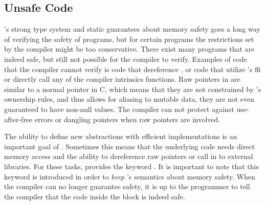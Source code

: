 \subsection{Unsafe Code} %
\label{ssub:unsafe_code}

{\rust}'s strong type system and static guarantees about memory safety goes a long way of verifying the safety of programs, but for certain programs the restrictions set by the compiler might be too conservative.
There exist many programs that are indeed safe, but still not possible for the compiler to verify.
Examples of code that the compiler cannot verify is code that dereference , or code that utilize {\rust}'s \gls{ffi} or directly call any of the compiler intrinsics functions.
Raw pointers in {\rust} are similar to a normal pointer in C, which means that they are not constrained by {\rust}'s ownership rules, and thus allows for aliasing to mutable data, they are not even guaranteed to have non-null values.
The compiler can not protect against use-after-free errors or dangling pointers when raw pointers are involved.

The ability to define new abstractions with efficient implementations is an important goal of {\rust}.
Sometimes this means that the underlying code needs direct memory access and the ability to dereference raw pointers or call in to external libraries.
For these tasks, {\rust} provides the keyword {\unsafe}.
It is important to note that this {\unsafe} keyword is introduced in order to \emph{keep} {\rust}'s semantics about memory safety.
When the compiler can no longer guarantee safety, it is up to the programmer to tell the compiler that the code inside the {\unsafe} block is indeed safe.

